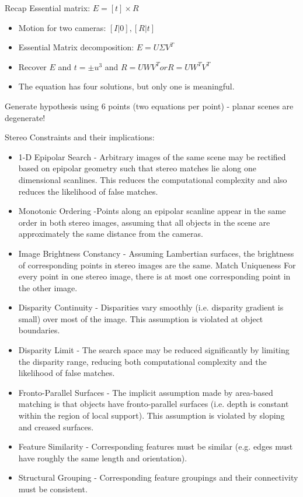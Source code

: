 Recap Essential matrix:  $E=[t]\times R$

\begin{itemize}
\item  Motion for two cameras: $[I|0], [R|t]$
\item Essential Matrix decomposition: $E= U \Sigma V^T$
\item Recover $E$ and $t = \pm u^3$ and $R=UWV^T or R=UW^TV^T$
\item The equation has four solutions, but only one is meaningful. 
\end{itemize}


Generate hypothesis using 6 points (two equations per point) - planar scenes are degenerate!

Stereo Constraints and their implications:
\begin{itemize}
\item 1-D Epipolar Search -  Arbitrary images of the same scene may be rectified based on epipolar geometry such that stereo matches lie along one dimensional scanlines. This reduces the computational complexity
and also reduces the likelihood of false matches.
\item Monotonic Ordering  -Points along an epipolar scanline appear in the same order in both stereo images, assuming that all objects in the scene are approximately the same distance from the cameras.
\item Image Brightness Constancy - Assuming Lambertian surfaces, the brightness of corresponding
points in stereo images are the same.
Match Uniqueness For every point in one stereo image, there is at most one corresponding point in the other image.
\item Disparity Continuity - Disparities vary smoothly (i.e. disparity gradient is small) over most of the image. This assumption is violated at object boundaries.
\item Disparity Limit - The search space may be reduced significantly by limiting the disparity range, reducing both computational complexity and the likelihood of false matches.
\item Fronto-Parallel Surfaces - The implicit assumption made by area-based matching is that objects have fronto-parallel surfaces (i.e. depth is constant within the region of local support). This assumption is violated by sloping and creased surfaces.
\item Feature Similarity - Corresponding features must be similar (e.g. edges must have roughly the same length and orientation).
\item Structural Grouping - Corresponding feature groupings and their connectivity must be consistent.
\end{itemize}

